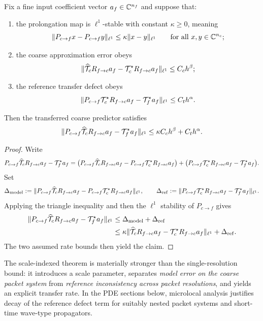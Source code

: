 \begin{theorem}
\label{thm:cross-resolution}
Fix a fine input coefficient vector $a_f\in\mathbb C^{n_f}$ and suppose that:
\begin{enumerate}
\item the prolongation map is $\ell^1$-stable with constant $\kappa\ge 0$, meaning
\[
\|P_{c\to f}x-P_{c\to f}y\|_{\ell^1}
\le
\kappa \|x-y\|_{\ell^1}
\qquad\text{for all }x,y\in\mathbb C^{n_c};
\]
\item the coarse approximation error obeys
\[
\|\widehat{\mathcal T}_c R_{f\to c} a_f - \mathcal T^\star_c R_{f\to c} a_f\|_{\ell^1}
\le
C_c h^\beta;
\]
\item the reference transfer defect obeys
\[
\|P_{c\to f}\mathcal T^\star_c R_{f\to c} a_f - \mathcal T^\star_f a_f\|_{\ell^1}
\le
C_t h^\alpha.
\]
\end{enumerate}
Then the transferred coarse predictor satisfies
\[
\|P_{c\to f}\widehat{\mathcal T}_c R_{f\to c} a_f - \mathcal T^\star_f a_f\|_{\ell^1}
\le
\kappa C_c h^\beta + C_t h^\alpha.
\]
\end{theorem}

\begin{proof}
Write
\[
P_{c\to f}\widehat{\mathcal T}_c R_{f\to c} a_f - \mathcal T^\star_f a_f
=
\bigl(P_{c\to f}\widehat{\mathcal T}_c R_{f\to c} a_f
-
P_{c\to f}\mathcal T^\star_c R_{f\to c} a_f\bigr)
+
\bigl(P_{c\to f}\mathcal T^\star_c R_{f\to c} a_f - \mathcal T^\star_f a_f\bigr).
\]
Set
\[
\Delta_{\mathrm{model}}
:=
\|P_{c\to f}\widehat{\mathcal T}_c R_{f\to c} a_f
-
P_{c\to f}\mathcal T^\star_c R_{f\to c} a_f\|_{\ell^1},
\qquad
\Delta_{\mathrm{ref}}
:=
\|P_{c\to f}\mathcal T^\star_c R_{f\to c} a_f
-
\mathcal T^\star_f a_f\|_{\ell^1}.
\]
Applying the triangle inequality and then the $\ell^1$ stability of $P_{c\to f}$ gives
\begin{align*}
\|P_{c\to f}\widehat{\mathcal T}_c R_{f\to c} a_f - \mathcal T^\star_f a_f\|_{\ell^1}
&\le \Delta_{\mathrm{model}}+\Delta_{\mathrm{ref}}\\
&\le
\kappa\|\widehat{\mathcal T}_c R_{f\to c} a_f
-\mathcal T^\star_c R_{f\to c} a_f\|_{\ell^1}
+\Delta_{\mathrm{ref}}.
\end{align*}
The two assumed rate bounds then yield the claim.
\end{proof}

The scale-indexed theorem is materially stronger than the single-resolution bound: it introduces a scale parameter, separates \emph{model error on the coarse packet system} from \emph{reference inconsistency across packet resolutions}, and yields an explicit transfer rate. In the PDE sections below, microlocal analysis justifies decay of the reference defect term for suitably nested packet systems and short-time wave-type propagators.

